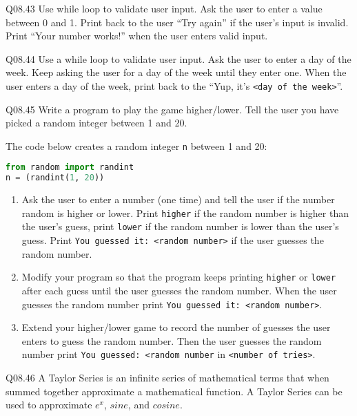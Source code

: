 \documentclass{book}
\newcommand{\passthrough}[1]{#1}
\begin{document}
Q08.43 Use while loop to validate user input. Ask the user to enter a
value between 0 and 1. Print back to the user ``Try again'' if the
user's input is invalid. Print ``Your number works!'' when the user
enters valid input.

Q08.44 Use a while loop to validate user input. Ask the user to enter a
day of the week. Keep asking the user for a day of the week until they
enter one. When the user enters a day of the week, print back to the
``Yup, it's \passthrough{\lstinline!<day of the week>!}''.

Q08.45 Write a program to play the game higher/lower. Tell the user you
have picked a random integer between 1 and 20.

The code below creates a random integer \passthrough{\lstinline!n!}
between 1 and 20:

\begin{lstlisting}[language=Python]
from random import randint
n = (randint(1, 20))
\end{lstlisting}

\begin{enumerate}
\def\labelenumi{(\alph{enumi})}
\item
  Ask the user to enter a number (one time) and tell the user if the
  number random is higher or lower. Print
  \passthrough{\lstinline!higher!} if the random number is higher than
  the user's guess, print \passthrough{\lstinline!lower!} if the random
  number is lower than the user's guess. Print
  \passthrough{\lstinline!You guessed it: <random number>!} if the user
  guesses the random number.
\item
  Modify your program so that the program keeps printing
  \passthrough{\lstinline!higher!} or \passthrough{\lstinline!lower!}
  after each guess until the user guesses the random number. When the
  user guesses the random number print
  \passthrough{\lstinline!You guessed it: <random number>!}.
\item
  Extend your higher/lower game to record the number of guesses the user
  enters to guess the random number. Then the user guesses the random
  number print \passthrough{\lstinline!You guessed: <random number!} in
  \passthrough{\lstinline!<number of tries>!}.
\end{enumerate}

Q08.46 A Taylor Series is an infinite series of mathematical terms that
when summed together approximate a mathematical function. A Taylor
Series can be used to approximate \(e^x\), \(sine\), and \(cosine\).
\end{document}

